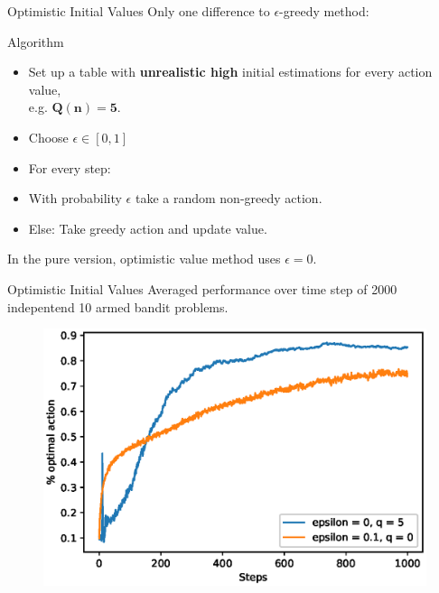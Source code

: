 \documentclass{beamer}
\begin{document}
\begin{frame}{Optimistic Initial Values}
	Only one difference to $\epsilon$-greedy method:
	\begin{exampleblock}{Algorithm}
	\begin{itemize}
	\item Set up a table with \textbf{unrealistic high}  initial estimations for every action value, \\ e.g. $\mathbf{Q(n) = 5}$.
	\item Choose $\epsilon \in [0,1]$
	\item For every step:
	\item \hspace{1cm}With probability $\epsilon$ take a random non-greedy action.
	\item \hspace{1cm}Else: Take greedy action and update value.
	\end{itemize}	
	\end{exampleblock}
	In the pure version, optimistic value method uses $\epsilon = 0$. 
\end{frame}

\begin{frame}{Optimistic Initial Values}
Averaged performance over time step of 2000 indepentend 10 armed bandit problems.
	\begin{figure}
	\centering
	\includegraphics[width=0.9\linewidth]{Images/figure_2_3.eps}\\	
	\end{figure}
\end{frame}
\end{document}
